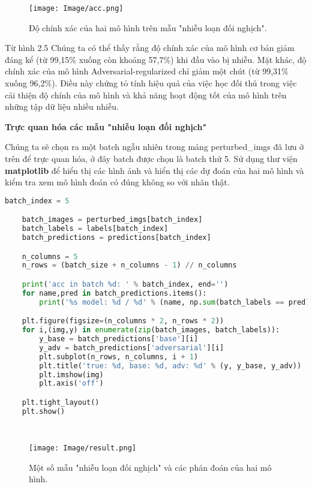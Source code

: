 \begin{figure}[h!]
    \centering
    \texttt{[image: Image/acc.png]}
    \caption{Độ chính xác của hai mô hình trên mẫu "nhiễu loạn đối nghịch".}
    \label{fig 2.5:Độ chính xác của hai mô hình trên mẫu "nhiễu loạn đối nghịch".}
    
\end{figure}

Từ hình 2.5 Chúng ta có thể thấy rằng độ chính xác của mô hình cơ bản giảm đáng kể (từ 99,15\% xuống còn khoảng 57,7\%) khi đầu vào bị nhiễu. Mặt khác, 
độ chính xác của mô hình Adversarial-regularized chỉ giảm một chút (từ 99,31\% xuống 96,2\%). Điều này chứng tỏ tính hiệu quả của việc học đối thủ trong 
việc cải thiện độ chính của mô hình và khả năng hoạt động tốt của mô hình trên những tập dữ liệu nhiều nhiễu.

\textbf{Trực quan hóa các mẫu "nhiễu loạn đối nghịch"}

Chúng ta sẽ chọn ra một batch ngẫu nhiên trong mảng perturbed\_imgs đã lưu ở trên để trực quan hóa, ở đây batch được chọn là batch thứ 5.
Sử dụng thư viện \textbf{matplotlib} để hiển thị các hình ảnh và hiển thị các dự đoán của hai mô hình và kiểm tra xem mô hình đoán có đúng không so với
nhãn thật.


\begin{lstlisting}[language = Python]
    batch_index = 5

    batch_images = perturbed_imgs[batch_index]
    batch_labels = labels[batch_index]
    batch_predictions = predictions[batch_index]

    n_columns = 5
    n_rows = (batch_size + n_columns - 1) // n_columns

    print('acc in batch %d: ' % batch_index, end='')
    for name,pred in batch_predictions.items():
        print('%s model: %d / %d' % (name, np.sum(batch_labels == pred), batch_size))

    plt.figure(figsize=(n_columns * 2, n_rows * 2))
    for i,(img,y) in enumerate(zip(batch_images, batch_labels)):
        y_base = batch_predictions['base'][i]
        y_adv = batch_predictions['adversarial'][i]
        plt.subplot(n_rows, n_columns, i + 1)
        plt.title('true: %d, base: %d, adv: %d' % (y, y_base, y_adv))
        plt.imshow(img)
        plt.axis('off')

    plt.tight_layout()
    plt.show()

    
\end{lstlisting}

\begin{figure}[h!]
    \centering
    \texttt{[image: Image/result.png]}
    \caption{Một số mẫu "nhiễu loạn đối nghịch" và các phán đoán của hai mô hình.}
    \label{fig 2.6:Một số mẫu "nhiễu loạn đối nghịch" và các phán đoán của hai mô hình.}
    
\end{figure}

